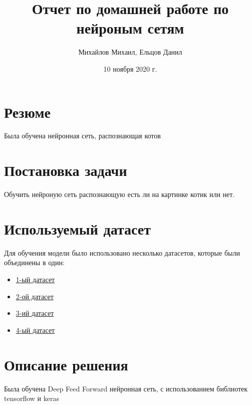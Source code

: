 \documentclass{article}
\title{Отчет по домашней работе по нейроным сетям}
\author{Михайлов Михаил, Ельцов Данил}
\date{10 ноября 2020 г.}
\begin{document}
\maketitle
\tableofcontents

\section*{Резюме}
Была обучена нейронная сеть, распознающая котов
\newpage
\section{Постановка задачи}
Обучить нейроную сеть распознающую есть ли на картинке котик или нет.

\section{Используемый датасет}
Для обучения модели было использовано несколько датасетов, которые были объединены в один:

\begin{itemize}
    \item \href{https://storage.googleapis.com/openimages/web/extended.html}{1-ый датасет}
    \item \href{https://www.kaggle.com/alessiocorrado99/animals10}{2-ой датасет}
    \item \href{https://www.kaggle.com/zippyz/cats-and-dogs-breeds-classification-oxford-dataset}{3-ий датасет}
    \item \href{https://www.kaggle.com/crawford/cat-dataset}{4-ый датасет}
\end{itemize}

\section{Описание решения}
Была обучена Deep Feed Forward нейронная сеть, с использованием библиотек tensorflow и keras
    
\end{document}
